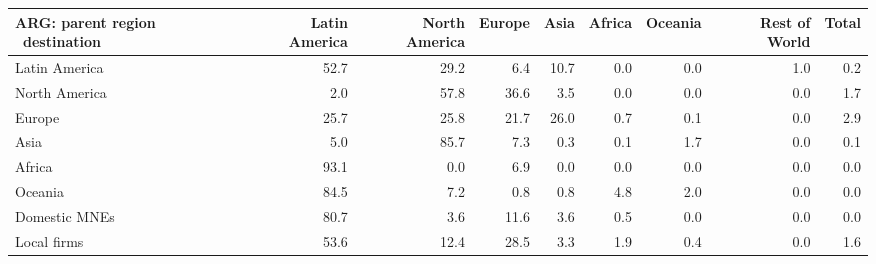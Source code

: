 \begin{tabular}{lrrrrrrrr}
\toprule
ARG: parent region \ destination & Latin America & North America & Europe & Asia & Africa & Oceania & Rest of World & Total \\
\midrule
Latin America & 52.7 & 29.2 & 6.4 & 10.7 & 0.0 & 0.0 & 1.0 & 0.2 \\
North America & 2.0 & 57.8 & 36.6 & 3.5 & 0.0 & 0.0 & 0.0 & 1.7 \\
Europe & 25.7 & 25.8 & 21.7 & 26.0 & 0.7 & 0.1 & 0.0 & 2.9 \\
Asia & 5.0 & 85.7 & 7.3 & 0.3 & 0.1 & 1.7 & 0.0 & 0.1 \\
Africa & 93.1 & 0.0 & 6.9 & 0.0 & 0.0 & 0.0 & 0.0 & 0.0 \\
Oceania & 84.5 & 7.2 & 0.8 & 0.8 & 4.8 & 2.0 & 0.0 & 0.0 \\
Domestic MNEs & 80.7 & 3.6 & 11.6 & 3.6 & 0.5 & 0.0 & 0.0 & 0.0 \\
Local firms & 53.6 & 12.4 & 28.5 & 3.3 & 1.9 & 0.4 & 0.0 & 1.6 \\
\bottomrule
\end{tabular}
